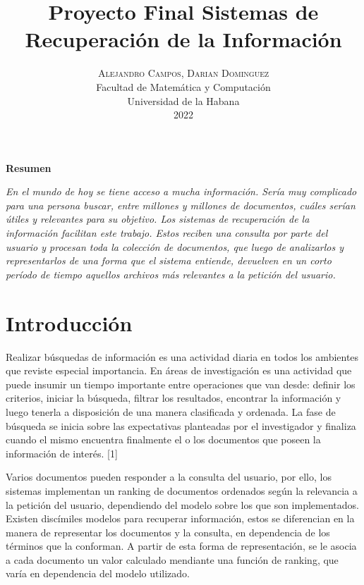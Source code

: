 \documentclass[twoside]{article}
\title{\vspace{-0.5cm}\fontsize{20pt}{10pt}\selectfont\textbf{Proyecto Final Sistemas de Recuperaci\'on de la Informaci\'on}}
\author{
\large
\textsc{\vspace{-2cm} Alejandro Campos, Darian Dominguez}\\[3.5cm]
\normalsize Facultad de Matem\'atica y Computaci\'on \\
\normalsize Universidad de la Habana \\
\normalsize 2022 \\[1cm]
\vspace{-5mm}
}
\date{}
\begin{document}
\maketitle

\thispagestyle{fancy} 

\begin{center}
\textbf{Resumen}
\end{center}
\noindent \textit{ En el mundo de hoy se tiene acceso a mucha informaci\'on. Ser\'ia muy complicado para una persona buscar, entre millones y millones de documentos, cu\'ales ser\'ian \'utiles y relevantes para su objetivo. Los sistemas de recuperaci\'on de la informaci\'on facilitan este trabajo. Estos reciben una consulta por parte del usuario y procesan toda la colecci\'on de documentos, que luego de analizarlos y representarlos de una forma que el sistema entiende, devuelven en un corto per\'iodo de tiempo aquellos archivos m\'as relevantes a la petici\'on del usuario.}\\[0.5cm]


\section{Introducci\'on}
\qquad Realizar b\'usquedas de informaci\'on es una actividad diaria en todos los ambientes que reviste especial importancia. En \'areas de investigaci\'on es una actividad que puede insumir un tiempo importante entre operaciones que van desde: definir los criterios, iniciar la b\'usqueda, filtrar los resultados, encontrar la informaci\'on y luego tenerla a disposici\'on de una manera clasificada y ordenada. La fase de b\'usqueda se inicia sobre las expectativas planteadas por el investigador y finaliza cuando el mismo encuentra finalmente el o los documentos que poseen la informaci\'on de inter\'es. [1]

Varios documentos pueden responder a la consulta del usuario, por ello, los sistemas implementan un ranking de documentos ordenados seg\'un la relevancia a la petici\'on del usuario, dependiendo del modelo sobre los que son implementados. Existen disc\'imiles modelos para recuperar informaci\'on, estos se diferencian en la manera de representar los documentos y la consulta, en dependencia de los t\'erminos que la conforman. A partir de esta forma de representaci\'on, se le asocia a cada documento un valor calculado mendiante una funci\'on de ranking, que var\'ia en dependencia del modelo utilizado. 
\end{document}
